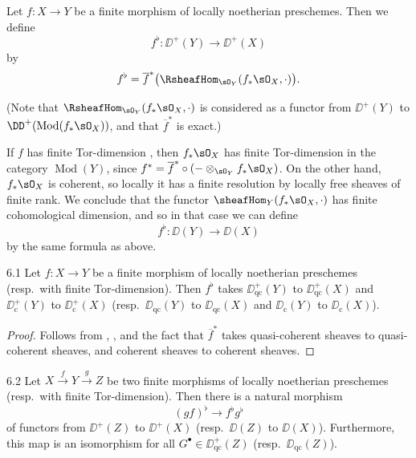 \begin{definition*}
Let $f\colon X\to Y$ be a finite morphism of locally noetherian preschemes. Then we define
\[
f^{\flat}\colon \DD^+(Y) \longrightarrow \DD^+(X)
\]
by
\[
f^{\flat} = \overline{f}^*\bigl(\RsheafHom_{\sO_Y}(f_*\sO_X, \cdot)\bigr).
\]

(Note that $\RsheafHom_{\sO_Y}(f_*\sO_X,\cdot)$ is considered as a functor from $\DD^+(Y)$ to $\DD^+(\operatorname{Mod}(f_*\sO_X))$, and that $\overline{f}^*$ is exact.)

If $f$ has finite Tor-dimension , then $f_*\sO_X$ has finite Tor-dimension in the category $\operatorname{Mod}(Y)$, since $f^*=\overline{f}^*\circ(-\otimes_{\sO_Y}f_*\sO_X)$. On the other hand, $f_*\sO_X$ is coherent, so locally it has a finite resolution by locally free sheaves of finite rank. We conclude that the functor $\sheafHom_Y(f_*\sO_X,\cdot)$ has finite cohomological dimension, and so in that case we can define
\[
f^{\flat}\colon \DD(Y) \longrightarrow \DD(X)
\]
by the same formula as above.
\end{definition*}

\begin{bookproposition}{6.1}\label{prop:3.6.1}
Let $f\colon X\to Y$ be a finite morphism of locally noetherian preschemes (resp.\ with finite Tor-dimension). Then $f^{\flat}$ takes $\DD_{\mathrm{qc}}^+(Y)$ to $\DD_{\mathrm{qc}}^+(X)$ and $\DD_{\mathrm{c}}^+(Y)$ to $\DD_{\mathrm{c}}^+(X)$ (resp.\ $\DD_{\mathrm{qc}}(Y)$ to $\DD_{\mathrm{qc}}(X)$ and $\DD_{\mathrm{c}}(Y)$ to $\DD_{\mathrm{c}}(X)$).
\end{bookproposition}

\begin{proof}
Follows from , , and the fact that $\overline{f}^*$ takes quasi-coherent sheaves to quasi-coherent sheaves, and coherent sheaves to coherent sheaves.
\end{proof}

\begin{bookproposition}{6.2}\label{prop:3.6.2}
Let $X\xrightarrow{f} Y\xrightarrow{g} Z$ be two finite morphisms of locally noetherian preschemes (resp.\ with finite Tor-dimension). Then there is a natural morphism
\[
(gf)^{\flat} \longrightarrow f^{\flat}g^{\flat}
\]
of functors from $\DD^+(Z)$ to $\DD^+(X)$ (resp.\ $\DD(Z)$ to $\DD(X)$). Furthermore, this map is an isomorphism for all $G^\bullet\in\DD_{\mathrm{qc}}^+(Z)$ (resp.\ $\DD_{\mathrm{qc}}(Z)$).
\end{bookproposition}

